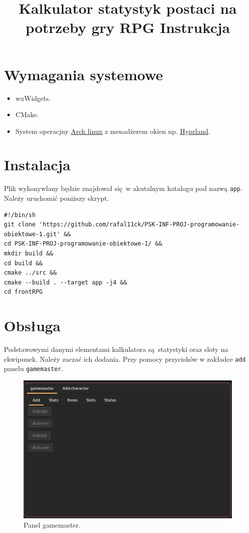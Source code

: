 \documentclass[11pt]{article}
\date{}
\title{Kalkulator statystyk postaci na potrzeby gry RPG Instrukcja}
\begin{document}
\maketitle
\newpage
\section{Wymagania systemowe}
\label{sec:org2e5ebcc}
\begin{itemize}
\item wxWidgets.
\item CMake.
\item System operacjny \href{https://wiki.archlinux.org/title/Arch\_Linux}{Arch linux} z menadżerem okien np. \href{https://hyprland.org/}{Hyprland}.
\end{itemize}
\section{Instalacja}
\label{sec:orgceb15bf}
Plik wykonywlany będzie znajdował się w akutalnym katalogu pod nazwą \texttt{app}. Należy uruchomić poniższy skrypt.
\begin{verbatim}
#!/bin/sh
git clone 'https://github.com/rafal11ck/PSK-INF-PROJ-programowanie-obiektowe-1.git' &&
cd PSK-INF-PROJ-programowanie-obiektowe-1/ &&
mkdir build &&
cd build &&
cmake ../src &&
cmake --build . --target app -j4 &&
cd frontRPG
\end{verbatim}
\newpage
\section{Obsługa}
\label{sec:org7d94f0c}
Podstawowymi danymi elementami kalkulatora są statystyki oraz sloty na ekwipunek. Należy zaczać ich dodania. Przy pomocy przycisków w zakładce \texttt{add} panelu \texttt{gamemaster}.
\begin{figure}[htbp]
\centering
\includegraphics[width=.9\linewidth]{img/gamemaster.png}
\caption{Panel gamemaster.}
\end{figure}
\end{document}
